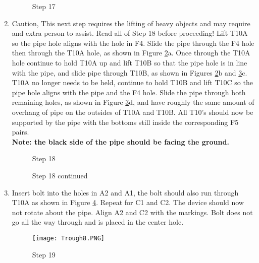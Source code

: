 \documentclass[11pt,english]{article}
\begin{document}
\begin{enumerate}
\begin{figure}[ht!]
    \caption{Step 17}%
    \label{fig:step17}%
\end{figure}
\newpage
\item   Caution, This next step requires the lifting of heavy objects and may require and extra person to assist. Read all of Step 18 before proceeding! Lift T10A so the pipe hole aligns with the hole in F4. Slide the pipe through the F4 hole then through the T10A hole, as shown in Figure \ref{fig:step 18 1}a. Once through the T10A hole continue to hold T10A up and lift T10B so that the pipe hole is in line with the pipe, and slide pipe through T10B, as shown in Figures \ref{fig:step 18 1}b and \ref{fig:step 18 2}c. T10A no longer needs to be held, continue to hold T10B and lift T10C so the pipe hole aligns with the pipe and the F4 hole. Slide the pipe through both remaining holes, as shown in Figure \ref{fig:step 18 2}d, and have roughly the same amount of overhang of pipe on the outsides of T10A and T10B. All T10's should now be supported by the pipe with the bottoms still inside the corresponding F5 pairs. 
\\ \textbf{Note: the black side of the pipe should be facing the ground.}  

\begin{figure}[ht!]%
    \centering
    \qquad
    \caption{Step 18}%
    \label{fig:step 18 1}%
\end{figure}

\begin{figure}[ht!]%
    \centering
    \qquad
    \caption{Step 18 continued}%
    \label{fig:step 18 2}%
\end{figure}
\clearpage
\newpage
\item   Insert bolt into the holes in A2 and A1, the bolt should also run through T10A as shown in Figure \ref{fig:step19}. Repeat for C1 and C2. The device should now not rotate about the pipe. Align A2 and C2 with the markings. Bolt does not go all the way through and is placed in the center hole.  

\begin{figure}[ht!]
\centering
\texttt{[image: Trough8.PNG]}
\caption{Step 19}
\label{fig:step19}
\end{figure}


\end{enumerate}
\end{document}
